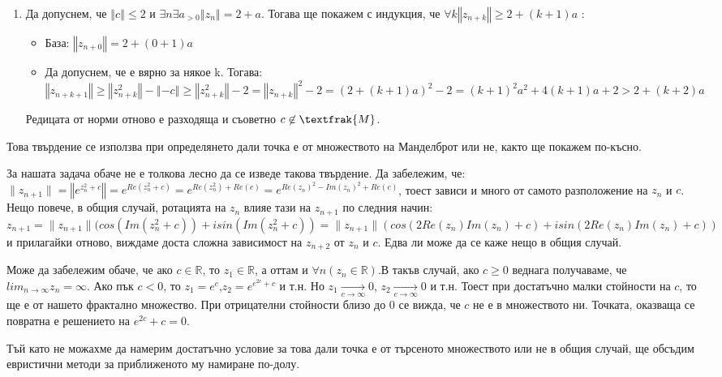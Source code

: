 \begin{Large}
\begin{enumerate}
\item
Да допуснем, че $\left\Vert c \right\Vert \leq 2$ и $\exists{n}\exists{a_{>0}}\left\Vert z_n \right\Vert=2+a$. Тогава ще покажем с индукция, че $\forall{k} \left\Vert z_{n+k} \right\Vert \geq 2+(k+1)a$ :
\begin{itemize}

\item База: $\left\Vert z_{n+0} \right\Vert = 2+(0+1)a$

\item Да допуснем, че е вярно за някое k. Тогава:
$\left\Vert z_{n+k+1} \right\Vert \geq \left\Vert z_{n+k}^2 \right\Vert -  \left\Vert -c \right\Vert \geq \left\Vert z_{n+k}^2 \right\Vert - 2 = {\left\Vert z_{n+k} \right\Vert}^2 - 2 = (2+(k+1)a)^2 - 2 = (k+1)^2 a^2+4(k+1)a+2>2+(k+2)a$

\end{itemize}
Редицата от норми отново е разходяща и съоветно $c\not\in \textfrak{M}$.

\end{enumerate}
Това твърдение се използва при определянето дали точка е от множеството на Манделброт или не, както ще покажем по-късно.

\par
За нашата задача обаче не е толкова лесно да се изведе такова твърдение. Да забележим, че:
$\lVert z_{n+1}\rVert = \left\Vert e^{z_n^2+c} \right\Vert = e^{Re(z_n^2+c)} = e^{Re(z_n^2)+Re(c)}= e^{Re(z_n)^2-Im(z_n)^2+Re(c)}$, тоест зависи и много от самото разположение на $z_n$ и $c$. Нещо повече, в общия случай, ротацията на $z_n$ влияе тази на $z_{n+1}$ по следния начин: $z_{n+1}=\lVert z_{n+1}\rVert(cos(Im(z_n^2+c))+ i sin(Im(z_n^2+c))=\lVert z_{n+1}\rVert (cos(2 Re(z_n) Im(z_n) + c) + i sin(2 Re(z_n) Im(z_n) + c))$ и прилагайки отново, виждаме доста сложна зависимост на $z_{n+2}$ от $z_n$ и $c$. Едва ли може да се каже нещо в общия случай.
\par
Може да забележим обаче, че ако $c\in\mathbb{R}$, то $z_1\in\mathbb{R}$, а оттам и $\forall{n}(z_n\in\mathbb{R})$.В такъв случай, ако $c \geq 0$ веднага получаваме, че $lim_{n\to\infty}z_n=\infty$. Ако пък $c<0$, то $z_1=e^c$,$z_2=e^{e^{2c}+c}$ и т.н. Но $z_1  \xrightarrow[c\to\infty]{} 0$, $z_2\xrightarrow[c\to\infty]{} 0$ и т.н. Тоест при достатъчно малки стойности на $c$, то ще е от нашето фрактално множество. При отрицателни стойности близо до $0$ се вижда, че $c$ не е в множеството ни. Точката, оказваща се повратна е решението на $e^{2c}+c=0$.
\par
Тъй като не можахме да намерим достатъчно условие за това дали точка е от търсеното множеството или не в общия случай, ще обсъдим евристични методи за приближеното му намиране по-долу.

\end{Large}